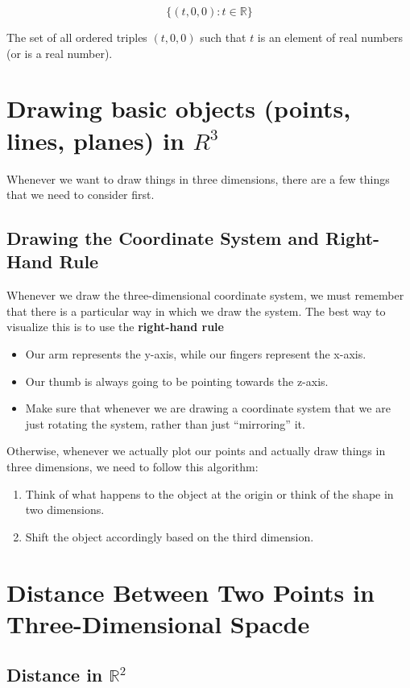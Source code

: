 \documentclass{report}
\newcommand{\R}{\mathbb{R}}
\begin{document}
\begin{sloppypar}
\begin{remark*}
  \[ \{(t, 0, 0): t \in \R \} \]
\end{remark*}
\begin{definition*}
  The set of all ordered triples $ (t, 0, 0 ) $ such that
  $ t $ is an element of real numbers (or is a real number).
\end{definition*}

\section{Drawing basic objects (points, lines, planes) in $
  R^{3}$}
Whenever we want to draw things in three dimensions, there
are a few things that we need to consider first.

\subsection{Drawing the Coordinate System and Right-Hand Rule}
Whenever we draw the three-dimensional coordinate system,
we must remember that there is a particular way in
which we draw the system. The best way to visualize
this is to use the \textbf{right-hand rule}
\begin{itemize}
  \item Our arm represents the y-axis, while our
        fingers represent the x-axis.
  \item Our thumb is always going to be pointing towards
        the z-axis.
  \item Make sure that whenever we are drawing
        a coordinate system that we are just rotating
        the system, rather than just ``mirroring'' it.
\end{itemize}
Otherwise, whenever we actually plot our points
and actually draw things in three dimensions, we need
to follow this algorithm:
\begin{enumerate}
  \item Think of what happens to the object at the origin or
        think of the shape in two dimensions.
  \item Shift the object accordingly based on the
        third dimension.
\end{enumerate}


\section{Distance Between Two Points in Three-Dimensional
  Spacde}
\subsection{Distance in $ \R^{2} $}
\newtheorem{lem}{Formula}
\begin{center}
  \fbox{
    \parbox{\textwidth} {
      \begin{lem}
        Distance in $ \R^{2} $
        \[ \textrm{let $ d $ be distance}\]
        \[ d = \sqrt{(x_{2}-x_{1})^{2}+(y_{2}-y_{1})^{2}} \]
    \end{lem}
    }
  }
\end{center}


\end{sloppypar}
\end{document}
